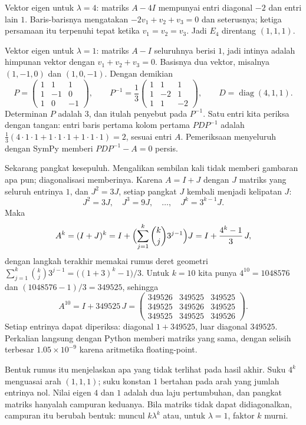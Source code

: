 Vektor eigen untuk $\lambda=4$: matriks $A-4I$ mempunyai entri diagonal $-2$ dan entri lain $1$.
Baris-barisnya mengatakan $-2v_{1}+v_{2}+v_{3}=0$ dan seterusnya; ketiga persamaan itu terpenuhi
tepat ketika $v_{1}=v_{2}=v_{3}$. Jadi $E_{4}$ direntang $(1,1,1)$.

Vektor eigen untuk $\lambda=1$: matriks $A-I$ seluruhnya berisi $1$, jadi intinya adalah himpunan
vektor dengan $v_{1}+v_{2}+v_{3}=0$. Basisnya dua vektor, misalnya $(1,-1,0)$ dan $(1,0,-1)$.
Dengan demikian
\[
  P=\begin{pmatrix}1&1&1\\ 1&-1&0\\ 1&0&-1\end{pmatrix},\qquad
  P^{-1}=\frac{1}{3}\begin{pmatrix}1&1&1\\ 1&-2&1\\ 1&1&-2\end{pmatrix},\qquad
  D=\operatorname{diag}(4,1,1).
\]
Determinan $P$ adalah $3$, dan itulah penyebut pada $P^{-1}$. Satu entri kita periksa dengan
tangan: entri baris pertama kolom pertama $PDP^{-1}$ adalah
$\tfrac{1}{3}(4\cdot1\cdot1+1\cdot1\cdot1+1\cdot1\cdot1)=2$, sesuai entri $A$. Pemeriksaan
menyeluruh dengan SymPy memberi $PDP^{-1}-A=0$ persis.

Sekarang pangkat kesepuluh. Mengalikan sembilan kali tidak memberi gambaran
apa pun; diagonalisasi memberinya. Karena $A=I+J$ dengan $J$ matriks yang seluruh entrinya $1$, dan
$J^{2}=3J$, setiap pangkat $J$ kembali menjadi kelipatan $J$:
\[
  J^{2}=3J,\quad J^{3}=9J,\quad\dots,\quad J^{k}=3^{k-1}J .
\]
Maka
\[
  A^{k}=(I+J)^{k}=I+\Bigl(\sum_{j=1}^{k}\binom{k}{j}3^{j-1}\Bigr)J
  =I+\frac{4^{k}-1}{3}\,J,
\]
dengan langkah terakhir memakai rumus deret geometri
$\sum_{j=1}^{k}\binom{k}{j}3^{j-1}=\bigl((1+3)^{k}-1\bigr)/3$. Untuk $k=10$ kita punya
$4^{10}=1048576$ dan $(1048576-1)/3=349525$, sehingga
\[
  A^{10}=I+349525\,J=
  \begin{pmatrix}349526&349525&349525\\ 349525&349526&349525\\ 349525&349525&349526\end{pmatrix}.
\]
Setiap entrinya dapat diperiksa: diagonal $1+349525$, luar diagonal $349525$. Perkalian langsung
dengan Python memberi matriks yang sama, dengan selisih terbesar $1.05\times10^{-9}$ karena
aritmetika floating-point.

Bentuk rumus itu menjelaskan apa yang tidak terlihat pada hasil akhir. Suku $4^{k}$ menguasai arah
$(1,1,1)$; suku konstan $1$ bertahan pada arah yang jumlah entrinya nol. Nilai eigen $4$ dan $1$
adalah dua laju pertumbuhan, dan pangkat matriks hanyalah campuran keduanya. Bila matriks tidak
dapat didiagonalkan, campuran itu berubah bentuk: muncul $k\lambda^{k}$ atau, untuk $\lambda=1$,
faktor $k$ murni.


